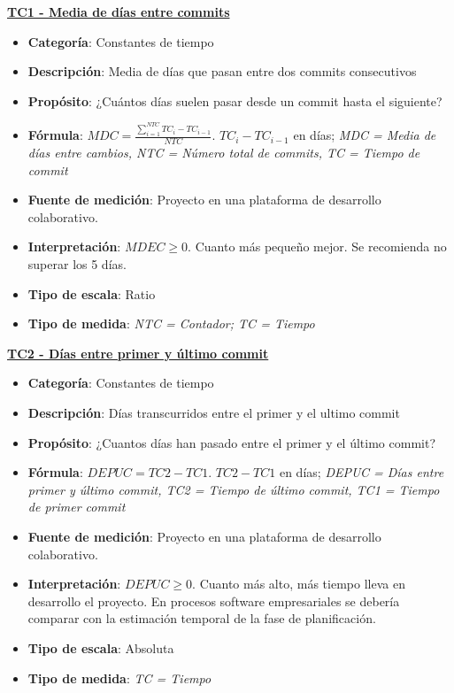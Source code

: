 \textbf{\underline{TC1 - Media de días entre commits}}

\begin{itemize}
	\item \textbf{Categoría}: Constantes de tiempo
	\item \textbf{Descripción}: Media de días que pasan entre dos commits consecutivos
	\item \textbf{Propósito}: ¿Cuántos días suelen pasar desde un commit hasta el siguiente?
	\item \textbf{Fórmula}: $MDC = \frac{\sum_{i=1}^{NTC} TC_i - TC_{i-1}}{NTC}$. $TC_i - TC_{i-1}$ en días; \textit{MDC = Media de días entre cambios, NTC = Número total de commits, TC = Tiempo de commit}
	\item \textbf{Fuente de medición}: Proyecto en una plataforma de desarrollo colaborativo.
	\item \textbf{Interpretación}: $MDEC \geq 0$. Cuanto más pequeño mejor. Se recomienda no superar los 5 días.
	\item \textbf{Tipo de escala}: Ratio
	\item \textbf{Tipo de medida}: \textit{NTC = Contador; TC = Tiempo}
\end{itemize}

\textbf{\underline{TC2 - Días entre primer y último commit}}

\begin{itemize}
	\item \textbf{Categoría}: Constantes de tiempo
	\item \textbf{Descripción}: Días transcurridos entre el primer y el ultimo commit 
	\item \textbf{Propósito}: ¿Cuantos días han pasado entre el primer y el último commit?
	\item \textbf{Fórmula}: $DEPUC = TC2- TC1$. $TC2- TC1$ en días;  \textit{DEPUC = Días entre primer y último commit, TC2 = Tiempo de último commit, TC1 = Tiempo de primer commit}
	\item \textbf{Fuente de medición}: Proyecto en una plataforma de desarrollo colaborativo.
	\item \textbf{Interpretación}: $DEPUC \geq 0$. Cuanto más alto, más tiempo lleva en desarrollo el proyecto. En procesos software empresariales se debería comparar con la estimación temporal de la fase de planificación. 
	\item \textbf{Tipo de escala}: Absoluta
	\item \textbf{Tipo de medida}: \textit{TC = Tiempo}
\end{itemize}

